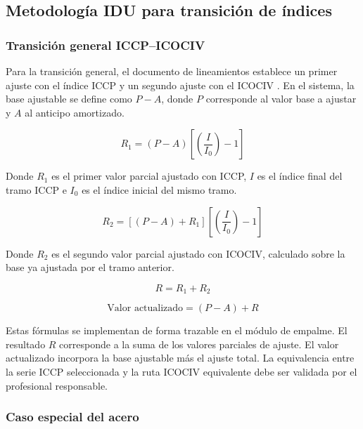 \documentclass[12pt,letterpaper]{article}
\providecommand{\parencite}{\citep}
\newcommand{\ICOCIV}{ICOCIV}
\newcommand{\ICCP}{ICCP}
\begin{document}
\subsection{Metodología IDU para transición de índices}

\subsubsection{Transición general ICCP--ICOCIV}

Para la transición general, el documento de lineamientos establece un primer ajuste con el índice \ICCP{} y un segundo ajuste con el \ICOCIV{} \parencite{idu_circular_6_2022}. En el sistema, la base ajustable se define como \(P-A\), donde \(P\) corresponde al valor base a ajustar y \(A\) al anticipo amortizado.

\begin{equation}
\label{eq:r1_general}
R_1 = (P - A) \left[ \left( \frac{I}{I_0} \right) - 1 \right]
\end{equation}

Donde \(R_1\) es el primer valor parcial ajustado con \ICCP, \(I\) es el índice final del tramo \ICCP{} e \(I_0\) es el índice inicial del mismo tramo.

\begin{equation}
\label{eq:r2_general}
R_2 = [(P - A) + R_1] \left[ \left( \frac{I}{I_0} \right) - 1 \right]
\end{equation}

Donde \(R_2\) es el segundo valor parcial ajustado con \ICOCIV, calculado sobre la base ya ajustada por el tramo anterior.

\begin{equation}
\label{eq:r_total}
R = R_1 + R_2
\end{equation}

\begin{equation}
\label{eq:valor_actualizado_general}
\text{Valor actualizado} = (P - A) + R
\end{equation}

Estas fórmulas se implementan de forma trazable en el módulo de empalme. El resultado \(R\) corresponde a la suma de los valores parciales de ajuste. El valor actualizado incorpora la base ajustable más el ajuste total. La equivalencia entre la serie \ICCP{} seleccionada y la ruta \ICOCIV{} equivalente debe ser validada por el profesional responsable.

\subsubsection{Caso especial del acero}
\end{document}
